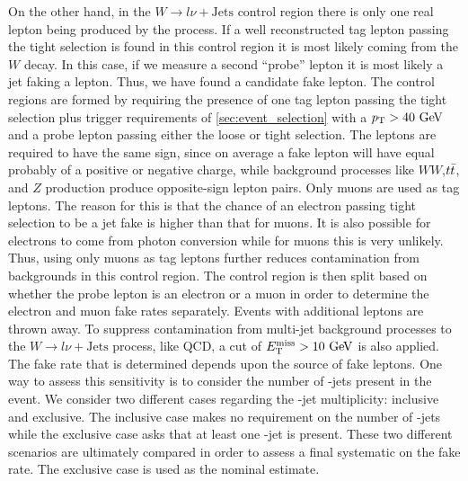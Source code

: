 On the other hand, in the 
$W\rightarrow l\nu + \textrm{Jets}$ control region there
is only one real lepton being produced by the process.
If a well reconstructed tag lepton passing the tight selection
is found in this control 
region it is most likely coming from the $W$ decay.
In this case, if we measure a second ``probe'' lepton it is most likely
a jet faking a lepton. Thus, we have found a candidate fake lepton.
The control regions are formed by requiring the presence
of one tag lepton passing the tight selection
plus trigger requirements
of \sec\ref{sec:event_selection} with a $\pt>40\GeV$ and 
a probe lepton passing either the loose or tight selection.
The leptons are required to have the same sign, since
on average a fake lepton will have equal probably of
a positive or negative charge, while background processes
like $WW$,$t\bar{t}$, and $Z$ production produce opposite-sign lepton
pairs.  Only muons are used as tag leptons. 
The reason for this is that the chance of an electron passing tight selection
to be a jet fake is higher than that for muons. It is also 
possible for electrons to come from photon conversion 
while for muons this is very unlikely. Thus, using only muons as tag
leptons further reduces contamination from backgrounds in this control
region. The control region is then split based on whether the probe
lepton is an electron or a muon in order to determine the electron
and muon fake rates separately.
Events with additional leptons are thrown away.
To suppress contamination from multi-jet background processes
to the $W\rightarrow l\nu + \textrm{Jets}$ process, like QCD,
a cut of $\met>10\GeV$ is also applied.
The fake rate that is determined depends upon the source of fake leptons.
One way to assess this sensitivity is to consider the number of
\bee-jets present in the event. We consider two different
cases regarding the \bee-jet multiplicity: inclusive and exclusive.
The inclusive case makes no requirement on the number of \bee-jets
while the exclusive case asks that at least one \bee-jet is present.
These two different scenarios are ultimately compared in order to assess
a final systematic on the fake rate. The exclusive case
is used as the nominal estimate.

